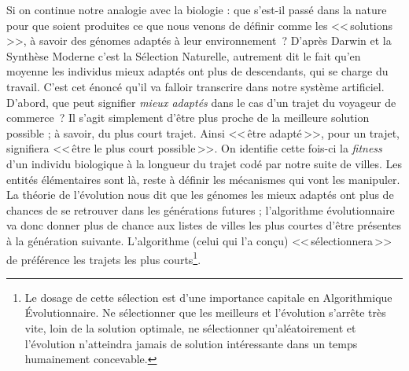 Si on continue notre analogie avec la biologie : que s'est-il passé dans la nature pour que soient produites ce que nous venons de définir comme les <<\,solutions\,>>, à savoir des génomes adaptés à leur environnement~? D'après Darwin et la Synthèse Moderne c'est la Sélection Naturelle, autrement dit le fait qu'en moyenne les individus mieux adaptés ont plus de descendants, qui se charge du travail. C'est cet énoncé qu'il va falloir transcrire dans notre système artificiel. D'abord, que peut signifier \emph{mieux adaptés} dans le cas d'un trajet du voyageur de commerce~? Il s'agit simplement d'être plus proche de la meilleure solution possible ; à savoir, du plus court trajet. Ainsi <<\,être adapté\,>>, pour un trajet, signifiera <<\,être le plus court possible\,>>. On identifie cette fois-ci la \emph{fitness} d'un individu biologique à la longueur du trajet codé par notre suite de villes. Les entités élémentaires sont là, reste à définir les mécanismes qui vont les manipuler. La théorie de l'évolution nous dit que les génomes les mieux adaptés ont plus de chances de se retrouver dans les générations futures ; l'algorithme évolutionnaire va donc donner plus de chance aux listes de villes les plus courtes d'être présentes à la génération suivante. L'algorithme (celui qui l'a conçu) <<\,sélectionnera\,>> de préférence les trajets les plus courts\footnote{Le dosage de cette sélection est d'une importance capitale en Algorithmique Évolutionnaire. Ne sélectionner que les meilleurs et l'évolution s'arrête très vite, loin de la solution optimale, ne sélectionner qu'aléatoirement et l'évolution n'atteindra jamais de solution intéressante dans un temps humainement concevable.}.

